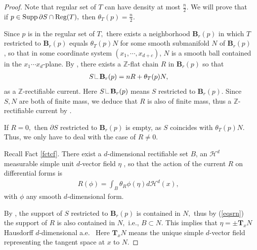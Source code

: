 \documentclass[11pt,a4paper]{amsart}
\numberwithin{equation}{section}
\newcommand{\hm}{\mathcal{H}}
\newcommand{\ta}{\theta}
\newcommand\res{\mathop{\hbox{\vrule height 7pt width .3pt depth 0pt
			\vrule height .3pt width 5pt depth 0pt}}\nolimits}
\newcommand{\cd}{\cdots}
\newcommand{\T}{\mathbf{T}}
\newcommand{\s}{\subset}
\newcommand{\br}{\mathbf{B}_r}
\newcommand{\spt}{\operatorname{Supp}}
\newcommand{\pd}{\partial}
\newcommand{\Z}{\mathbb{Z}}
\theoremstyle{plain}
\theoremstyle{definition}
\numberwithin{equation}{subsection}
\begin{document}
	\begin{proof}
		Note that regular set of $T$ can have density at most $\frac{n}{2}$. We will prove that if $p\in\spt \pd S\cap \textnormal{Reg}(T),$ then $\ta_T(p)= \frac{n}{2}.$ 
		
		Since $p$ is in the regular set of $T,$ there exists a neighborhood $\br(p)$ in which $T$ restricted to $\br(p)$ equals $\ta_T(p) N$ for some smooth submanifold $N$ of $\br(p)$, so that in some coordinate system $(x_1,\cd,x_{d+c})$, $N$ is a smooth ball contained in the $x_1\cd x_d$-plane. By \cite[Corollary 1.4]{RY}, there exists a $\Z$-flat chain $R$ in $\br(p)$ so that
		\begin{align}\label{eqsrn}
			S\res \br(p)=nR+\ta_T(p) N,
		\end{align} as a $\Z$-rectifiable current. Here $S\res \br(p)$ means $S$ restricted to $\br(p).$ Since $S,N$ are both of finite mass, we deduce that $R$ is also of finite mass, thus a $\Z$-rectifiable current by \cite[Section 4.2.16]{HF}.
		
		If $R=0,$ then $\pd S$ restricted to $\br(p)$ is empty, as $S$ coincides with $\ta_T(p)N.$ Thus, we only have to deal with the case of $R\not=0.$
		
		Recall Fact \ref{fctcf}.
		There exist a $d$-dimensional rectifiable set $B$, an $\hm^d$ measurable simple unit $d$-vector field $\eta$ , so that the action of the current $R$ on differential forms is
		\begin{align*}
			R(\phi)=\int_B\ta_R\phi(\eta) d\hm^d(x), 
		\end{align*}
		with $\phi$ any smooth $d$-dimensional form. 
		
		By \cite[page 430]{HF}, the support of $S$ restricted to $\br(p)$ is contained in $N,$ thus by (\ref{eqsrn}) the support of $R$ is also contained in $N,$ i.e., $B\s N.$ This implies that $\eta=\pm \T_x N$ Hausdorff $d$-dimensional a.e.~ Here $\T_x N$ means the unique simple $d$-vector field representing the tangent space at $x$ to $N.$
		

\end{proof}
\end{document}

